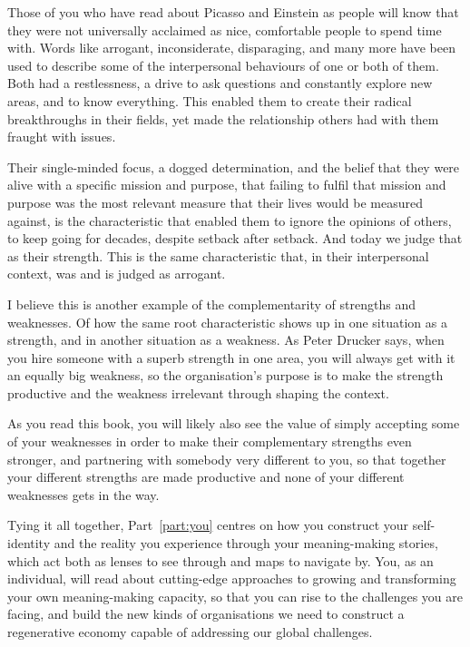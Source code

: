 Those of you who have read about Picasso and Einstein as people will know that they were not universally acclaimed as nice, comfortable people to spend time with. Words like arrogant, inconsiderate, disparaging, and many more have been used to describe some of the interpersonal behaviours of one or both of them. Both had a restlessness, a drive to ask questions and constantly explore new areas, and to know everything. This enabled them to create their radical breakthroughs in their fields, yet made the relationship others had with them fraught with issues. 


Their single-minded focus, a dogged determination, and the belief that they were alive with a specific mission and purpose, that failing to fulfil that mission and purpose was the most relevant measure that their lives would be measured against, is the characteristic that enabled them to ignore the opinions of others, to keep going for decades, despite setback after setback. And today we judge that as their strength. This is the same characteristic that, in their interpersonal context, was and is judged as arrogant.


I believe this is another example of the complementarity of strengths and weaknesses. Of how the same root characteristic shows up in one situation as a strength, and in another situation as a weakness. As Peter Drucker says\cite{drucker-eff-exec}, when you hire someone with a superb strength in one area, you will always get with it an equally big weakness, so the organisation’s purpose is to make the strength productive and the weakness irrelevant through shaping the context.


As you read this book, you will likely also see the value of simply accepting some of your weaknesses in order to make their complementary strengths even stronger, and partnering with somebody very different to you, so that together your different strengths are made productive and none of your different weaknesses gets in the way. 


Tying it all together, Part~\ref{part:you} centres on how you construct your self-identity and the reality you experience through your meaning\hyp{}making stories, which act both as lenses to see through and maps to navigate by. You, as an individual, will read about cutting-edge approaches to growing and transforming your own meaning\hyp{}making capacity, so that you can rise to the challenges you are facing, and build the new kinds of organisations we need to construct a regenerative economy capable of addressing our global challenges.


